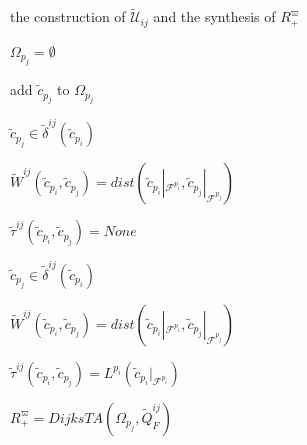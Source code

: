 \documentclass[journal]{IEEEtran}
\begin{document}
\begin{algorithm}
  \caption{the construction of $\widetilde{\mathcal{U}}_{ij}$ and the synthesis of $R^{\varpi}_+$}

%
%
%
%
%

  $\Omega_{p_j}=\emptyset$

  {

    {
        add $\tilde{c}_{p_j}$ to $\Omega_{p_j}$
    }
    {
        {
            {
                $\tilde{c}_{p_j}\in \tilde{\delta}^{ij}(\tilde{c}_{p_i})$

                $\widetilde{W}^{ij}(\tilde{c}_{p_i},\tilde{c}_{p_j})=dist(\tilde{c}_{p_i}|_{\mathcal{F}^{p_i}},\tilde{c}_{p_j}|_{\mathcal{F}^{p_j}})$

                $\tilde{\tau}^{ij}(\tilde{c}_{p_i},\tilde{c}_{p_j}) = None$
            }
            \Else
            {
                {
                    $\tilde{c}_{p_j}\in \tilde{\delta}^{ij}(\tilde{c}_{p_i})$

                    $\widetilde{W}^{ij}(\tilde{c}_{p_i},\tilde{c}_{p_j})=dist(\tilde{c}_{p_i}|_{\mathcal{F}^{p_i}},\tilde{c}_{p_j}|_{\mathcal{F}^{p_j}})$

                    $\tilde{\tau}^{ij}(\tilde{c}_{p_i},\tilde{c}_{p_j})=L^{p_i}(\tilde{c}_{p_i}|_{\mathcal{F}^{p_i}})$
                }
            }
        }
    }
  }
  $R^{\varpi}_+=DijksTA(\Omega_{p_j},\widetilde{Q}^{ij}_F)$


\end{algorithm}
\end{document}
